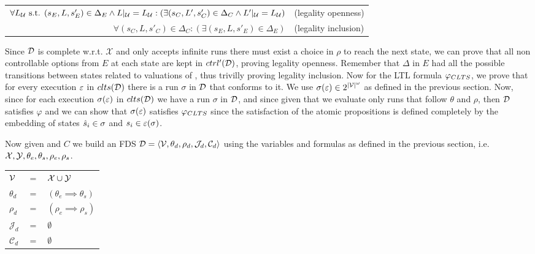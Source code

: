 \begin{center}
	\begin{tabular}{r l}
		
		$\forall L_{\mathcal{U}}\text{ s.t. }(s_E, L, s'_E) \in \Delta_E \wedge L|_{\mathcal{U}} = L_{\mathcal{U}}:( \exists (s_C, L', s'_C) \in \Delta_C \wedge L'|_{\mathcal{U}} = L_{\mathcal{U}})$ &(legality openness)\\
		$\forall (s_C, L, s'_C) \in \Delta_C: ( \exists (s_E, L, s'_E) \in \Delta_E)$& (legality inclusion)\\
	\end{tabular}
\end{center}

Since $\mathcal{D}$ is complete w.r.t. $\mathcal{X}$ and only accepts infinite runs there must exist a choice in $\rho$ to reach the next state, we can prove that all non controllable options from $E$ at each state are kept in $ctrl'(\mathcal{D})$, proving legality openness. Remember that $\Delta$ in $E$ had all the possible transitions between states related to valuations of \gsV, thus trivilly proving legality inclusion.
Now for the LTL formula $\varphi_{CLTS}$, we prove that for every execution $\varepsilon$ in $clts(\mathcal{D})$ there is a run $\sigma$ in $\mathcal{D}$ that conforms to it. We use $\sigma(\varepsilon) \in 2^{|\mathcal{V}|^{\omega}}$ as defined in the previous section.
Now, since for each execution $\sigma(\varepsilon)$ in $clts(\mathcal{D})$ we have a run $\sigma$ in $\mathcal{D}$, and since given that we evaluate only runs that follow $\theta$ and $\rho$, then $\mathcal{D}$ satisfies $\varphi$ and we can show that $\sigma(\varepsilon)$ satisfies $\varphi_{CLTS}$ since the satisfaction of the atomic propositions is defined completely by the embedding of states $\hat{s}_{i} \in \sigma$ and $s_i \in \varepsilon(\sigma)$.

Now given \cltsCPEmbeddingDef and $C$ we build an FDS $\mathcal{D}=\langle \mathcal V, \theta_d, \rho_d, \mathcal{J}_d, \mathcal{C}_d \rangle$ using the variables and formulas as defined in the previous section, i.e. ${\mathcal{X}}, {\mathcal{Y}}, {\theta_e}, {\theta_s}, {\rho_e}, {\rho_s}$.

\begin{tabular}{ l c l }
	${\mathcal{V}}$ & $=$ & ${\mathcal{X}} \cup {\ensuremath{\mathcal{Y}}}$\\	
	$\theta_d$ & $=$ & $(\theta_e \implies \theta_s)$\\
	$\rho_d$ & $=$ & $(\rho_e \implies \rho_s)$\\	
	$\mathcal{J}_d$ & $=$ & $\emptyset$\\
	$\mathcal{C}_d$ & $=$ & $\emptyset$\\
\end{tabular}

